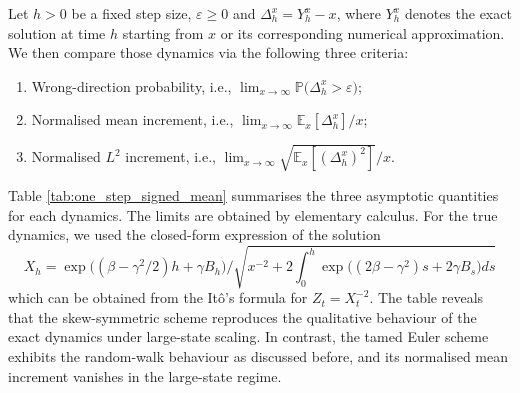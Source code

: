 \documentclass[11pt]{article}
\begin{document}
Let $h > 0$ be a fixed step size, $\varepsilon \ge 0$ and $\Delta_h^x = Y_h^x - x$, where $Y_h^x$ denotes the exact solution at time $h$ starting from $x$ or its corresponding numerical approximation. We then compare those dynamics via the following three criteria:
\begin{enumerate}
\item Wrong-direction probability, i.e., $\lim_{x \to \infty} \mathbb{P} \bigl( \Delta_h^x  > \varepsilon \bigr)$; 
\item Normalised mean increment, i.e., $\lim_{x \to \infty} \mathbb{E}_x [\Delta_h^x] / x$;
\item Normalised $L^2$ increment, i.e., $\lim_{x \to \infty} \sqrt{\mathbb{E}_x [(\Delta_h^x)^2]}/x$.
\end{enumerate}
Table \ref{tab:one_step_signed_mean} summarises the three asymptotic quantities for each dynamics. The limits are obtained by elementary calculus. For the true dynamics, we used the closed-form expression of the solution \[
X_h = \exp \bigl( (\beta - \gamma^2/2) h + \gamma B_h \bigr) / \sqrt{x^{-2} + 2 \int_0^h \exp \big( (2 \beta - \gamma^2) s + 2 \gamma B_s \bigr) ds }
\]
which can be obtained from the It\^o's formula for $Z_t = X_t^{-2}$. The table reveals that the skew-symmetric scheme reproduces the qualitative behaviour of the exact dynamics under large-state scaling. In contrast, the tamed Euler scheme exhibits the random-walk behaviour as discussed before, and its normalised mean increment vanishes in the large-state regime. 
\end{document}
